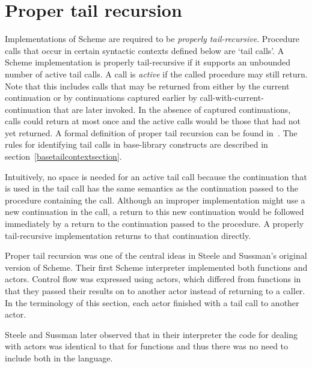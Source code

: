 \section{Proper tail recursion}
\label{proper tail recursion}

Implementations of Scheme are required to be
{\em properly tail-recursive}.
Procedure calls that occur in certain syntactic
contexts defined below are `tail calls'.  A Scheme implementation is
properly tail-recursive if it supports an unbounded number of active
tail calls.  A call is {\em active} if the called procedure may still
return.  Note that this includes calls that may be returned from either
by the current continuation or by continuations captured earlier by
{\cf call-with-current-continuation} that are later invoked.
In the absence of captured continuations, calls could
return at most once and the active calls would be those that had not
yet returned.
A formal definition of proper tail recursion can be found
in~\cite{propertailrecursion}.  The rules for identifying tail calls
in base-library constructs are described in
section~\ref{basetailcontextsection}.

\begin{rationale}

Intuitively, no space is needed for an active tail call because the
continuation that is used in the tail call has the same semantics as the
continuation passed to the procedure containing the call.  Although an improper
implementation might use a new continuation in the call, a return
to this new continuation would be followed immediately by a return
to the continuation passed to the procedure.  A properly tail-recursive
implementation returns to that continuation directly.

Proper tail recursion was one of the central ideas in Steele and
Sussman's original version of Scheme.  Their first Scheme interpreter
implemented both functions and actors.  Control flow was expressed using
actors, which differed from functions in that they passed their results
on to another actor instead of returning to a caller.  In the terminology
of this section, each actor finished with a tail call to another actor.

Steele and Sussman later observed that in their interpreter the code
for dealing with actors was identical to that for functions and thus
there was no need to include both in the language.

\end{rationale}

